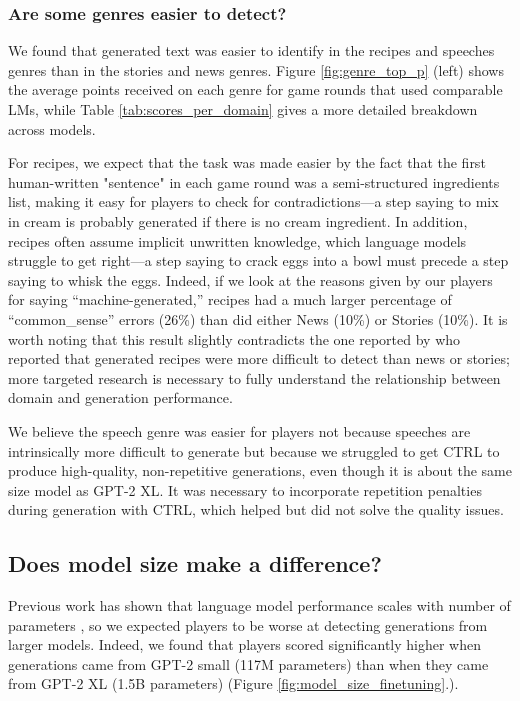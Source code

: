 \subsubsection{Are some genres easier to detect?}
We found that generated text was easier to identify in the recipes and speeches genres than in the stories and news genres.
Figure \ref{fig:genre_top_p} (left) shows the average points received on each genre for game rounds that used comparable LMs, while Table \ref{tab:scores_per_domain} gives a more detailed breakdown across models. 

For recipes, we expect that the task was made easier by the fact that the first human-written "sentence" in each game round was a semi-structured ingredients list, making it easy for players to check for contradictions---a step saying to mix in cream is probably generated if there is no cream ingredient.
In addition, recipes often assume implicit unwritten knowledge, which language models struggle to get right---a step saying to crack eggs into a bowl must precede a step saying to  whisk the eggs.
Indeed, if we look at the reasons given by our players for saying ``machine-generated,'' recipes had a much larger percentage of ``common\_sense'' errors (26\%) than did either News (10\%) or Stories (10\%).
It is worth noting that this result slightly contradicts the one reported by \citet{clark2021all} who reported that generated recipes were more difficult to detect than news or stories; more targeted research is necessary to fully understand the relationship between domain and generation performance.

We believe the speech genre was easier for players not because speeches are intrinsically more difficult to generate but because we struggled to get CTRL to produce high-quality, non-repetitive generations, even though it is about the same size model as GPT-2 XL.
It was necessary to incorporate repetition penalties during generation with CTRL, which helped but did not
solve the quality issues.

\subsection{Does model size make a difference?}
Previous work has shown that language model performance scales with number of parameters \citep{kaplan2020scaling}, so we expected players to be worse at detecting generations from larger models.
Indeed, we found that players scored significantly higher when generations came from GPT-2 small (117M parameters) than when they came from GPT-2 XL (1.5B parameters) (Figure \ref{fig:model_size_finetuning}.).


